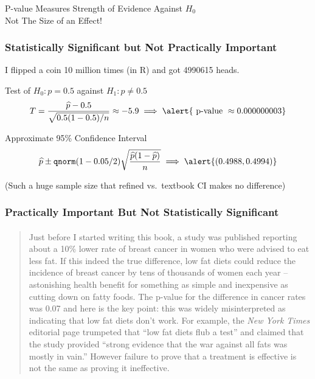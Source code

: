 \begin{frame}
\begin{center}
\Huge P-value Measures Strength of Evidence Against $H_0$\\ \alert{Not The Size of an Effect!}
\end{center}
\end{frame}
\begin{frame}
\frametitle{Statistically Significant but Not Practically Important}
\small
I flipped a coin 10 million times (in R) and got 4990615 heads.
\begin{block}{Test of $H_0\colon p = 0.5$ against $H_1\colon p \neq 0.5$}
$$T = \displaystyle \frac{\widehat{p} - 0.5}{\sqrt{0.5(1-0.5)/n}} \approx -5.9   \implies \alert{\mbox{ p-value } \approx 0.000000003}$$
\end{block}

\begin{block}{Approximate 95\% Confidence Interval}
 $$\widehat{p} \pm \texttt{qnorm}(1 - 0.05/2) \sqrt{\frac{\widehat{p}(1-\widehat{p})}{n}}  \implies \alert{(0.4988, 0.4994)}$$
\end{block}

\footnotesize (Such a huge sample size that refined vs.\ textbook CI makes no difference)
\large
\vspace{1em}

\alert{}
\end{frame}


\begin{frame}
\frametitle{Practically Important But Not Statistically Significant}
\framesubtitle{\href{http://www.amazon.com/p-value-Stories-Actually-Understand-Statistics/dp/0321629302}{}}
\footnotesize
\begin{quote}
Just before I started writing this book, a study was published reporting about a 10\% lower rate of breast cancer in women who were advised to eat less fat. If this indeed the true difference, low fat diets could reduce the incidence of breast cancer by tens of thousands of women each year -- astonishing health benefit for something as simple and inexpensive as cutting down on fatty foods. The p-value for the difference in cancer rates was 0.07 and here is the key point: this was widely misinterpreted as indicating that low fat diets don't work. For example, the \emph{New York Times} editorial page trumpeted that ``low fat diets flub a test'' and claimed that the study provided ``strong evidence that the war against all fats was mostly in vain.'' \alert{However failure to prove that a treatment is effective is not the same as proving it ineffective.}
\end{quote}
\end{frame}
